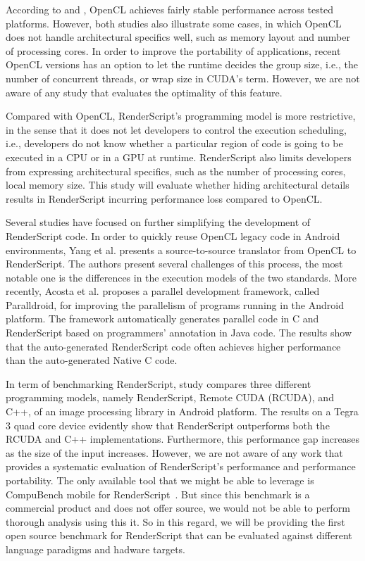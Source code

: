 According to \cite{komatsu2010evaluating} and \cite{dolbeau2013one}, OpenCL
achieves fairly stable performance across tested platforms. However, both
studies also illustrate some cases, in which OpenCL does not handle
architectural specifics well, such as memory layout and number of processing
cores. In order to improve the portability of applications, recent OpenCL
versions has an option to let the runtime decides the group size, i.e., the
number of concurrent threads, or wrap size in CUDA's term. However, we are not
aware of any study that evaluates the optimality of this feature.

Compared with OpenCL, RenderScript's programming model is more restrictive, in
the sense that it does not let developers to control the execution scheduling,
i.e., developers do not know whether a particular region of code is going to be
executed in a CPU or in a GPU at runtime. RenderScript also limits developers
from expressing architectural specifics, such as the number of processing cores,
local memory size. This study will evaluate whether hiding architectural details
results in RenderScript incurring performance loss compared to OpenCL.

Several studies have focused on further simplifying the development of
RenderScript code. In order to quickly reuse OpenCL legacy code in Android
environments, Yang et al.  \cite{yang2012o2render} presents a source-to-source
translator from OpenCL to RenderScript. The authors present several challenges
of this process, the most notable one is the differences in the execution models
of the two standards. More recently, Acosta et al.
\cite{alejandro2014performance} proposes a parallel development framework,
called Paralldroid, for improving the parallelism of programs running in the
Android platform. The framework automatically generates parallel code in C and
RenderScript based on programmers' annotation in Java code. The results show
that the auto-generated RenderScript code often achieves higher performance than
the auto-generated Native C code.

In term of benchmarking RenderScript, study \cite{kemp2013using} compares three
different programming models, namely RenderScript, Remote CUDA (RCUDA), and C++,
of an image processing library in Android platform. The results on a Tegra 3
quad core device evidently show that RenderScript outperforms both the RCUDA and
C++ implementations. Furthermore, this performance gap increases as the size of
the input increases.  However, we are not aware of any work that provides a
systematic evaluation of RenderScript's performance and performance portability.
The only available tool that we might be able to leverage is CompuBench mobile
for RenderScript~\cite{compuBenchMobile}.  But since this benchmark is a
commercial product and does not offer source, we would not be able to perform
thorough analysis using this it.  So in this regard, we will be providing the
first open source benchmark for RenderScript that can be evaluated against
different language paradigms and hadware targets.

